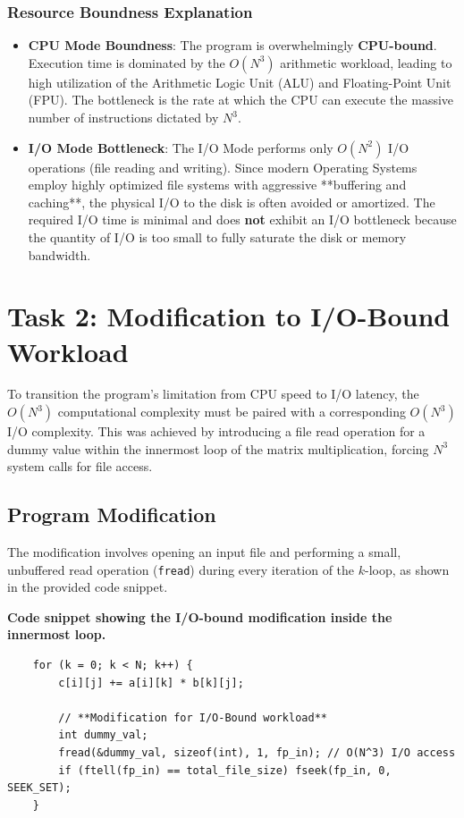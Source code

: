 \documentclass[11pt, a4paper]{article}
\begin{document}
\subsubsection{Resource Boundness Explanation}
\begin{itemize}
    \item \textbf{CPU Mode Boundness}: The program is overwhelmingly \textbf{CPU-bound}. Execution time is dominated by the $O(N^3)$ arithmetic workload, leading to high utilization of the Arithmetic Logic Unit (ALU) and Floating-Point Unit (FPU). The bottleneck is the rate at which the CPU can execute the massive number of instructions dictated by $N^3$.
    \item \textbf{I/O Mode Bottleneck}: The I/O Mode performs only $O(N^2)$ I/O operations (file reading and writing). Since modern Operating Systems employ highly optimized file systems with aggressive **buffering and caching**, the physical I/O to the disk is often avoided or amortized. The required I/O time is minimal and does \textbf{not} exhibit an I/O bottleneck because the quantity of I/O is too small to fully saturate the disk or memory bandwidth.
\end{itemize}

\section{Task 2: Modification to I/O-Bound Workload}

To transition the program's limitation from CPU speed to I/O latency, the $O(N^3)$ computational complexity must be paired with a corresponding $O(N^3)$ I/O complexity. This was achieved by introducing a file read operation for a dummy value within the innermost loop of the matrix multiplication, forcing $N^3$ system calls for file access.

\subsection{Program Modification}
The modification involves opening an input file and performing a small, unbuffered read operation (\texttt{fread}) during every iteration of the $k$-loop, as shown in the provided code snippet.

\noindent\textbf{Code snippet showing the I/O-bound modification inside the innermost loop.}
\begin{verbatim}
    for (k = 0; k < N; k++) {
        c[i][j] += a[i][k] * b[k][j];
        
        // **Modification for I/O-Bound workload**
        int dummy_val;
        fread(&dummy_val, sizeof(int), 1, fp_in); // O(N^3) I/O access
        if (ftell(fp_in) == total_file_size) fseek(fp_in, 0, SEEK_SET);
    }
\end{verbatim}
\end{document}
